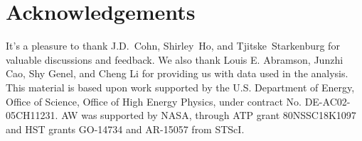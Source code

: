 \documentclass[12pt, letterpaper, preprint, tighten]{aastex62}
\begin{document}
\section*{Acknowledgements}
It's a pleasure to thank
    J.D.~Cohn,
    Shirley~Ho,
    and
    Tjitske~Starkenburg
for valuable discussions and feedback. We also thank Louis E. Abramson,
Junzhi Cao, Shy Genel, and Cheng Li for providing us with data used in
the analysis. This material is based upon work supported by the U.S.
Department of Energy, Office of Science, Office of High Energy Physics,
under contract No. DE-AC02-05CH11231. AW was supported by NASA, through 
ATP grant 80NSSC18K1097 and HST grants GO-14734 and AR-15057 from STScI.



\end{document}
